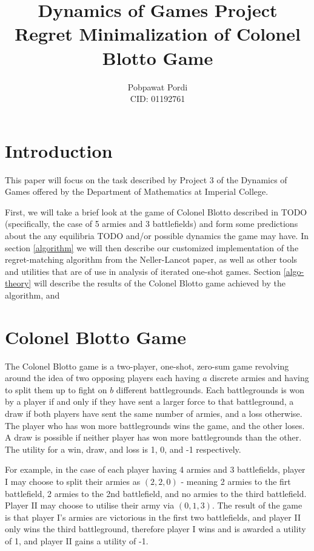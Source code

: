 \documentclass [11pt]{article}
\title{Dynamics of Games Project\\
  Regret Minimalization of Colonel Blotto Game
}
\author{Pobpawat Pordi \\
  CID: 01192761 \\
}
\begin{document}
\maketitle

\pagebreak

\tableofcontents

\pagebreak

\section{Introduction}

This paper will focus on the task described by Project 3 of the Dynamics of Games offered by the Department of Mathematics at Imperial College.

First, we will take a brief look at the game of Colonel Blotto described in TODO (specifically, the case of 5 armies and 3 battlefields) and form some predictions about the any equilibria TODO and/or possible dynamics the game may have. In section \ref{algorithm} we will then describe our customized implementation of the regret-matching algorithm from the Neller-Lancot paper, as well as other tools and utilities that are of use in analysis of iterated one-shot games. Section \ref{algo-theory} will describe the results of the Colonel Blotto game achieved by the algorithm, and

\section{Colonel Blotto Game} \label{blotto game}

The Colonel Blotto game is a two-player, one-shot, zero-sum game revolving around the idea of two opposing players each having $a$ discrete armies and having to split them up to fight on $b$ different battlegrounds. Each battlegrounds is won by a player if and only if they have sent a larger force to that battleground, a draw if both players have sent the same number of armies, and a loss otherwise. The player who has won more battlegrounds wins the game, and the other loses. A draw is possible if neither player has won more battlegrounds than the other. The utility for a win, draw, and loss is 1, 0, and -1 respectively.

For example, in the case of each player having 4 armies and 3 battlefields, player I may choose to split their armies as $(2, 2, 0)$ - meaning 2 armies to the firt battlefield, 2 armies to the 2nd battlefield, and no armies to the third battlefield. Player II may choose to utilise their army via $(0, 1, 3)$. The result of the game is that player I's armies are victorious in the first two battlefields, and player II only wins the third battleground, therefore player I wins and is awarded a utility of 1, and player II gains a utility of -1.
\end{document}
